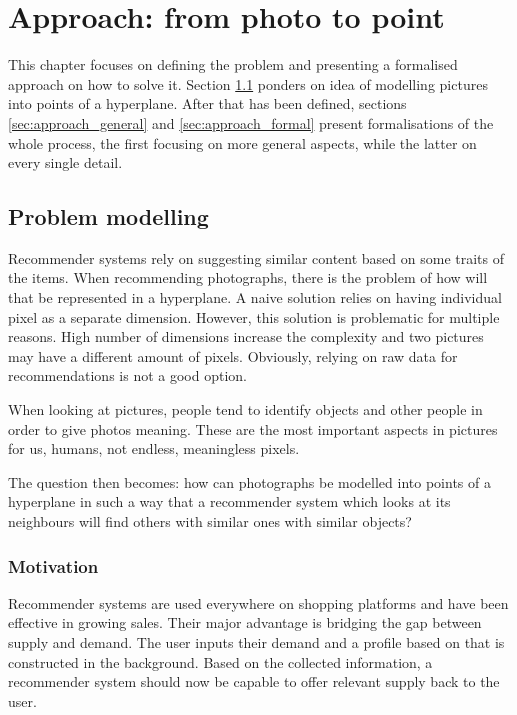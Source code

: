 \chapter{Approach: from photo to point}
\label {chap:approach}

This chapter focuses on defining the problem and presenting a formalised approach on how to solve it. Section \ref{sec:approach_modelling} ponders on idea of modelling pictures into points of a hyperplane. After that has been defined, sections \ref{sec:approach_general} and \ref{sec:approach_formal} present formalisations of the whole process, the first focusing on more general aspects, while the latter on every single detail.

\section{Problem modelling}
\label{sec:approach_modelling}

Recommender systems rely on suggesting similar content based on some traits of the items. When recommending photographs, there is the problem of how will that be represented in a hyperplane. A naive solution relies on having individual pixel as a separate dimension. However, this solution is problematic for multiple reasons. High number of dimensions increase the complexity and two pictures may have a different amount of pixels. Obviously, relying on raw data for recommendations is not a good option.

When looking at pictures, people tend to identify objects and other people in order to give photos meaning. These are the most important aspects in pictures for us, humans, not endless, meaningless pixels. 

The question then becomes: how can photographs be modelled into points of a hyperplane in such a way that a recommender system which looks at its neighbours will find others with similar ones with similar objects? 

\subsection{Motivation}
\label{subsec:approach_motivation}

Recommender systems are used everywhere on shopping platforms and have been effective in growing sales. Their major advantage is bridging the gap between supply and demand. The user inputs their demand and a profile based on that is constructed in the background. Based on the collected information, a recommender system should now be capable to offer relevant supply back to the user.

